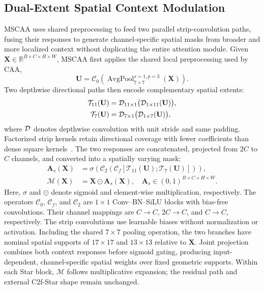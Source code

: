 \documentclass[letterpaper,10pt,conference]{ieeeconf}
\begin{document}
\subsection{Dual-Extent Spatial Context Modulation}
MSCAA uses shared preprocessing to feed two parallel strip-convolution paths,
fusing their responses to generate channel-specific spatial masks from broader
and more localized context without duplicating the entire attention module.
Given
\(\mathbf{X}\in\mathbb{R}^{B\times C\times H\times W}\), MSCAA first applies the
shared local preprocessing used by CAA,
\begin{equation}
 \mathbf{U}=\mathcal{C}_{0}\!\left(
 \operatorname{AvgPool}_{7\times7}^{s=1,p=3}(\mathbf{X})\right).
 \label{eq:mscaa_pre}
\end{equation}
Two depthwise directional paths then encode complementary spatial extents:
\begin{align}
 \mathcal{T}_{11}(\mathbf{U}) &={\cal D}_{11\times1}
     \bigl({\cal D}_{1\times11}(\mathbf{U})\bigr), \nonumber\\
 \mathcal{T}_{7}(\mathbf{U}) &={\cal D}_{7\times1}
     \bigl({\cal D}_{1\times7}(\mathbf{U})\bigr),
 \label{eq:mscaa_paths}
\end{align}
where \({\cal D}\) denotes depthwise convolution with unit stride and same
padding. Factorized strip kernels retain directional coverage with fewer
coefficients than dense square kernels~\cite{ref_strippooling,ref_replknet,
ref_lsknet}. The two responses are concatenated, projected from \(2C\) to \(C\)
channels, and converted into a spatially varying mask:
\begin{align}
 \mathbf{A}_{s}(\mathbf{X})&=\sigma\!\left(\mathcal{C}_{2}
   \left(\mathcal{C}_{f}[\mathcal{T}_{11}(\mathbf{U});
                         \mathcal{T}_{7}(\mathbf{U})]\right)\right),
 \label{eq:mscaa_mask}\\
 \mathcal{M}(\mathbf{X})&=\mathbf{X}\odot\mathbf{A}_{s}(\mathbf{X}),
 \quad \mathbf{A}_{s}\in(0,1)^{B\times C\times H\times W}.
 \label{eq:mscaa_output}
\end{align}
Here, \(\sigma\) and \(\odot\) denote sigmoid and element-wise multiplication,
respectively. The operators \(\mathcal{C}_0\),
\(\mathcal{C}_f\), and \(\mathcal{C}_2\) are \(1\times1\)
Conv--BN--SiLU blocks with bias-free convolutions. Their channel
mappings are \(C\to C\), \(2C\to C\), and \(C\to C\), respectively.
The strip convolutions use learnable biases without normalization
or activation. Including the shared \(7\times7\) pooling operation, the two branches have nominal spatial supports of \(17\times17\) and \(13\times13\) relative to \(\mathbf{X}\).
Joint projection combines both context responses before sigmoid gating,
producing input-dependent, channel-specific spatial weights over fixed geometric
supports. Within each Star block, \(\mathcal{M}\) follows multiplicative
expansion; the residual path and external C2f-Star shape remain unchanged.
\end{document}

